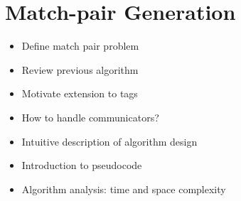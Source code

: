\section{Match-pair Generation}
\begin{itemize}
\item Define match pair problem
\item Review previous algorithm
\item Motivate extension to tags
\item How to handle communicators?
\item Intuitive description of algorithm design
\item Introduction to pseudocode
\end{itemize}



\begin{itemize}
\item Algorithm analysis: time and space complexity
\end{itemize}

